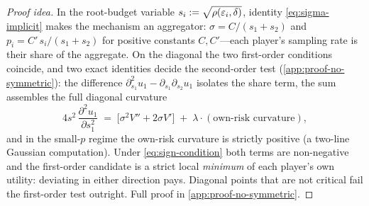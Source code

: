
\begin{proof}[Proof idea]
In the root-budget variable $s_i := \sqrt{\rho(\varepsilon_i,\delta)}$,
identity \eqref{eq:sigma-implicit} makes the mechanism an
aggregator: $\sigma = C/(s_1+s_2)$ and $p_i = C'\,s_i/(s_1+s_2)$
for positive constants $C, C'$---each player's sampling rate is
their share of the aggregate. On the diagonal the two first-order
conditions coincide, and two exact identities decide the
second-order test (\cref{app:proof-no-symmetric}): the difference
$\partial^2_{s_1} u_1 - \partial_{s_1}\partial_{s_2} u_1$ isolates
the share term, the sum assembles the full diagonal curvature
\begin{equation}
4 s^2\, \frac{\partial^2 u_1}{\partial s_1^2}
\;=\; \bigl[\sigma^2 V'' + 2\sigma V'\bigr]
\;+\; \lambda \cdot (\textrm{own-risk curvature}),
\label{eq:diag-curvature-main}
\end{equation}
and in the small-$p$ regime the own-risk curvature is strictly
positive (a two-line Gaussian computation). Under
\eqref{eq:sign-condition} both terms are non-negative and the first-order
candidate is a strict local \emph{minimum} of each player's own
utility: deviating in either direction pays. Diagonal points that
are not critical fail the first-order test outright. Full proof in
\cref{app:proof-no-symmetric}.
\end{proof}

